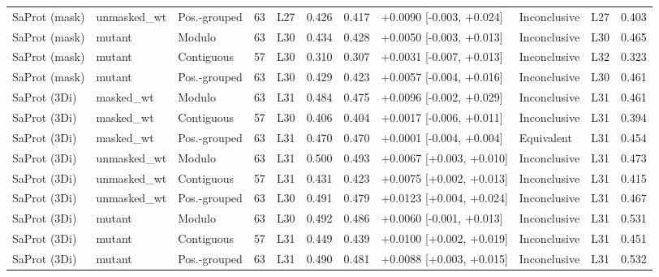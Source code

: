 \documentclass[11pt,a4paper]{article}
\begin{document}
\begin{table}[H]
{\begin{tabular}{lllrrrrlllr}
SaProt (mask) & unmasked\_wt & Pos.-grouped & 63 & L27 & 0.426 & 0.417 & +0.0090 [-0.003, +0.024] & Inconclusive & L27 & 0.403 \\
SaProt (mask) & mutant & Modulo & 63 & L30 & 0.434 & 0.428 & +0.0050 [-0.003, +0.013] & Inconclusive & L30 & 0.465 \\
SaProt (mask) & mutant & Contiguous & 57 & L30 & 0.310 & 0.307 & +0.0031 [-0.007, +0.013] & Inconclusive & L32 & 0.323 \\
SaProt (mask) & mutant & Pos.-grouped & 63 & L30 & 0.429 & 0.423 & +0.0057 [-0.004, +0.016] & Inconclusive & L30 & 0.461 \\
SaProt (3Di) & masked\_wt & Modulo & 63 & L31 & 0.484 & 0.475 & +0.0096 [-0.002, +0.029] & Inconclusive & L31 & 0.461 \\
SaProt (3Di) & masked\_wt & Contiguous & 57 & L30 & 0.406 & 0.404 & +0.0017 [-0.006, +0.011] & Inconclusive & L31 & 0.394 \\
SaProt (3Di) & masked\_wt & Pos.-grouped & 63 & L31 & 0.470 & 0.470 & +0.0001 [-0.004, +0.004] & Equivalent & L31 & 0.454 \\
SaProt (3Di) & unmasked\_wt & Modulo & 63 & L31 & 0.500 & 0.493 & +0.0067 [+0.003, +0.010] & Inconclusive & L31 & 0.473 \\
SaProt (3Di) & unmasked\_wt & Contiguous & 57 & L31 & 0.431 & 0.423 & +0.0075 [+0.002, +0.013] & Inconclusive & L31 & 0.415 \\
SaProt (3Di) & unmasked\_wt & Pos.-grouped & 63 & L30 & 0.491 & 0.479 & +0.0123 [+0.004, +0.024] & Inconclusive & L31 & 0.467 \\
SaProt (3Di) & mutant & Modulo & 63 & L30 & 0.492 & 0.486 & +0.0060 [-0.001, +0.013] & Inconclusive & L31 & 0.531 \\
SaProt (3Di) & mutant & Contiguous & 57 & L31 & 0.449 & 0.439 & +0.0100 [+0.002, +0.019] & Inconclusive & L31 & 0.451 \\
SaProt (3Di) & mutant & Pos.-grouped & 63 & L31 & 0.490 & 0.481 & +0.0088 [+0.003, +0.015] & Inconclusive & L31 & 0.532 \\
\bottomrule
\end{tabular}}\end{table}
\end{document}
